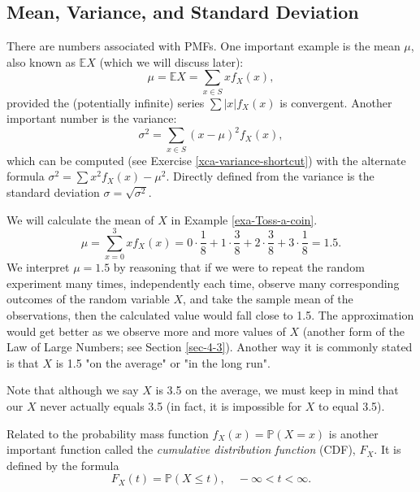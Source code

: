\subsection{Mean, Variance, and Standard Deviation}
\label{sec-5-1-2}

There are numbers associated with PMFs. One important example is the
mean \(\mu\), also known as \(\mathbb{E} X\) (which we will discuss
later):
\begin{equation}
\mu=\mathbb{E} X=\sum_{x\in S}xf_{X}(x),
\end{equation}
provided the (potentially infinite) series \(\sum|x|f_{X}(x)\) is convergent. Another important number is the variance:
\begin{equation}
\sigma^{2}=\sum_{x\in S}(x-\mu)^{2}f_{X}(x),
\end{equation}
which can be computed (see Exercise \ref{xca-variance-shortcut}) with the
alternate formula \(\sigma^{2}=\sum
x{}^{2}f_{X}(x)-\mu^{2}\). Directly defined from the variance is the
standard deviation \(\sigma=\sqrt{\sigma^{2}}\).

\label{exa-disc-pmf-mean} We will calculate the mean of \(X\) in Example
\ref{exa-Toss-a-coin}.  \[ \mu = \sum_{x = 0}^{3}xf_{X}(x) = 0 \cdot
\frac{1}{8} + 1 \cdot \frac{3}{8} + 2 \cdot
\frac{3}{8}+3\cdot\frac{1}{8} = 1.5. \] We interpret \(\mu = 1.5\) by
reasoning that if we were to repeat the random experiment many times,
independently each time, observe many corresponding outcomes of the
random variable \(X\), and take the sample mean of the observations,
then the calculated value would fall close to 1.5. The approximation
would get better as we observe more and more values of \(X\) (another
form of the Law of Large Numbers; see Section
\ref{sec-4-3}). Another way it is commonly stated is
that \(X\) is 1.5 "on the average" or "in the long run".


\begin{rem}
Note that although we say \(X\) is 3.5 on the average, we must keep in
mind that our \(X\) never actually equals 3.5 (in fact, it is
impossible for \(X\) to equal 3.5).
\end{rem}

Related to the probability mass function \(f_{X}(x)=\mathbb{P}(X=x)\)
is another important function called the \emph{cumulative distribution
function} (CDF), \(F_{X}\). It is defined by the formula
\begin{equation}
F_{X}(t)=\mathbb{P}(X\leq t),\quad -\infty < t < \infty.
\end{equation}

